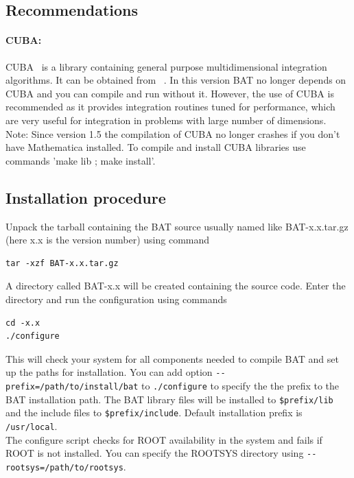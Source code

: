 \documentclass[11pt, a4paper]{article}
\begin{document}
\subsection{Recommendations}

\paragraph{CUBA:}
CUBA~\cite{CUBA} is a library containing general purpose
multidimensional integration algorithms. It can be obtained
from~\cite{CUBAweb} . In this version BAT no longer depends on CUBA
and you can compile and run without it. However, the use of CUBA is
recommended as it provides integration routines tuned for performance,
which are very useful for integration in problems with large number
of dimensions. \\ 

Note: Since version 1.5 the compilation of CUBA no longer crashes if
you don't have Mathematica installed. To compile and install CUBA
libraries use commands 'make lib ; make install'.

\subsection{Installation procedure}

Unpack the tarball containing the BAT source usually named like
BAT-x.x.tar.gz (here x.x is the version number) using command
%
\begin{verbatim}
tar -xzf BAT-x.x.tar.gz
\end{verbatim}
%
A directory called BAT-x.x will be created containing the source code.
Enter the directory and run the configuration using commands
%
\begin{verbatim}
cd -x.x
./configure
\end{verbatim}

This will check your system for all components needed to compile BAT
and set up the paths for installation. You can add option
\verb|--prefix=/path/to/install/bat| to \verb|./configure| to specify
the the prefix to the BAT installation path. The BAT library files
will be installed to \verb|$prefix/lib| and the include files to
\verb|$prefix/include|. Default installation prefix is
\verb|/usr/local|. \\ 

The configure script checks for ROOT availability in the system and
fails if ROOT is not installed. You can specify the ROOTSYS directory
using \verb|--rootsys=/path/to/rootsys|. \\ 
\end{document}
